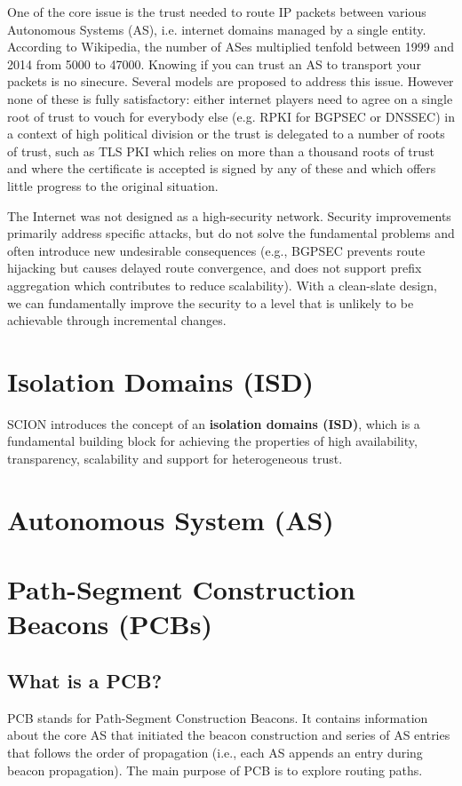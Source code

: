 One of the core issue is the trust needed to route IP packets between various Autonomous Systems (AS), i.e. internet domains managed by a single entity. According to Wikipedia, the number of ASes multiplied tenfold between 1999 and 2014 from 5000 to 47000. Knowing if you can trust an AS to transport your packets is no sinecure. Several models are proposed to address this issue. However none of these is fully satisfactory: either internet players need to agree on a single root of trust to vouch for everybody else (e.g. RPKI for BGPSEC or DNSSEC) in a context of high political division or the trust is delegated to a number of roots of trust, such as TLS PKI which relies on more than a thousand roots of trust and where the certificate is accepted is signed by any of these and which offers little progress to the original situation.

The Internet was not designed as a high-security network. Security improvements primarily address specific attacks, but do not solve the fundamental problems and often introduce new undesirable consequences (e.g., BGPSEC prevents route hijacking but causes delayed route convergence, and does not support prefix aggregation which contributes to reduce scalability). With a clean-slate design, we can fundamentally improve the security to a level that is unlikely to be achievable through incremental changes.

\section{Isolation Domains (ISD)}
SCION introduces the concept of an \textbf{isolation domains (ISD)}, which is a fundamental building block for achieving the properties of high availability, transparency, scalability and support for heterogeneous trust.

\section{Autonomous System (AS)}

\section{Path-Segment Construction Beacons (PCBs)}

\subsection{What is a PCB?}
PCB stands for Path-Segment Construction Beacons. It contains information about the core AS that initiated the beacon construction and series of AS entries that follows the order of propagation (i.e., each AS appends an entry during beacon propagation). The main purpose of PCB is to explore routing paths. 

